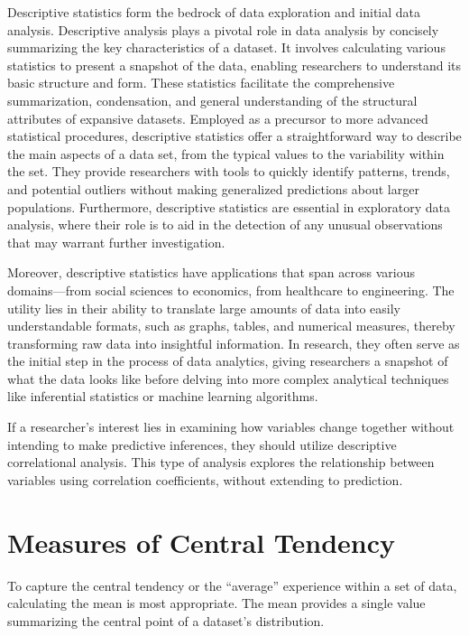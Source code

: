 \documentclass[
]{book}
\begin{document}
Descriptive statistics form the bedrock of data exploration and initial data analysis. Descriptive analysis plays a pivotal role in data analysis by concisely summarizing the key characteristics of a dataset. It involves calculating various statistics to present a snapshot of the data, enabling researchers to understand its basic structure and form. These statistics facilitate the comprehensive summarization, condensation, and general understanding of the structural attributes of expansive datasets. Employed as a precursor to more advanced statistical procedures, descriptive statistics offer a straightforward way to describe the main aspects of a data set, from the typical values to the variability within the set. They provide researchers with tools to quickly identify patterns, trends, and potential outliers without making generalized predictions about larger populations. Furthermore, descriptive statistics are essential in exploratory data analysis, where their role is to aid in the detection of any unusual observations that may warrant further investigation.

Moreover, descriptive statistics have applications that span across various domains---from social sciences to economics, from healthcare to engineering. The utility lies in their ability to translate large amounts of data into easily understandable formats, such as graphs, tables, and numerical measures, thereby transforming raw data into insightful information. In research, they often serve as the initial step in the process of data analytics, giving researchers a snapshot of what the data looks like before delving into more complex analytical techniques like inferential statistics or machine learning algorithms.

If a researcher's interest lies in examining how variables change together without intending to make predictive inferences, they should utilize descriptive correlational analysis. This type of analysis explores the relationship between variables using correlation coefficients, without extending to prediction.

\section{Measures of Central Tendency}\label{measures-of-central-tendency}

To capture the central tendency or the ``average'' experience within a set of data, calculating the mean is most appropriate. The mean provides a single value summarizing the central point of a dataset's distribution.
\end{document}
